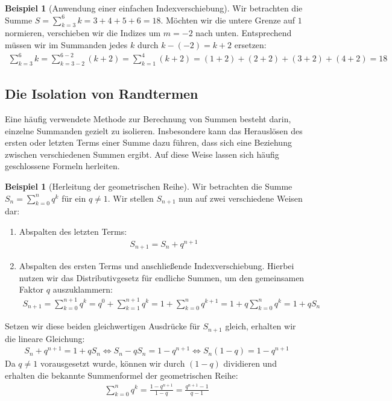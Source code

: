 \documentclass{article}
\theoremstyle{definition}
\newtheorem{bsp}[thm]{Beispiel}
\begin{document}
\begin{bsp}[Anwendung einer einfachen Indexverschiebung]
Wir betrachten die Summe $S = \sum_{k=3}^6 k = 3 + 4 + 5 + 6 = 18$. Möchten wir die untere Grenze auf $1$ normieren, verschieben wir die Indizes um $m = -2$ nach unten. Entsprechend müssen wir im Summanden jedes $k$ durch $k - (-2) = k + 2$ ersetzen:
\begin{align*}
    \sum_{k=3}^6 k = \sum_{k=3-2}^{6-2} (k+2) = \sum_{k=1}^4 (k+2) = (1+2) + (2+2) + (3+2) + (4+2) = 18
\end{align*}
\end{bsp}

\subsection{Die Isolation von Randtermen}
Eine häufig verwendete Methode zur Berechnung von Summen besteht darin, einzelne Summanden gezielt zu isolieren. Insbesondere kann das Herauslösen des ersten oder letzten Terms einer Summe dazu führen, dass sich eine Beziehung zwischen verschiedenen Summen ergibt. Auf diese Weise lassen sich häufig geschlossene Formeln herleiten.

\begin{bsp}[Herleitung der geometrischen Reihe]
Wir betrachten die Summe $S_n = \sum_{k=0}^n q^k$ für ein $q \neq 1$. Wir stellen $S_{n+1}$ nun auf zwei verschiedene Weisen dar:
\begin{enumerate}
    \item Abspalten des letzten Terms:
    \begin{align*}
        S_{n+1} = S_n + q^{n+1}
    \end{align*}
    \item Abspalten des ersten Terms und anschließende Indexverschiebung. Hierbei nutzen wir das Distributivgesetz für endliche Summen, um den gemeinsamen Faktor $q$ auszuklammern:
    \begin{align*}
        S_{n+1} = \sum_{k=0}^{n+1} q^k = q^0 + \sum_{k=1}^{n+1} q^k = 1 + \sum_{k=0}^n q^{k+1} = 1 + q \sum_{k=0}^n q^k = 1 + q S_n
    \end{align*}
\end{enumerate}
Setzen wir diese beiden gleichwertigen Ausdrücke für $S_{n+1}$ gleich, erhalten wir die lineare Gleichung:
\begin{align*}
    S_n + q^{n+1} = 1 + q S_n \Longleftrightarrow S_n - q S_n = 1 - q^{n+1} \Longleftrightarrow S_n(1 - q) = 1 - q^{n+1}
\end{align*}
Da $q \neq 1$ vorausgesetzt wurde, können wir durch $(1-q)$ dividieren und erhalten die bekannte Summenformel der geometrischen Reihe:
\begin{align*}
    \sum_{k=0}^n q^k = \frac{1 - q^{n+1}}{1 - q} = \frac{q^{n+1} - 1}{q - 1}
\end{align*}
\end{bsp}
\end{document}
